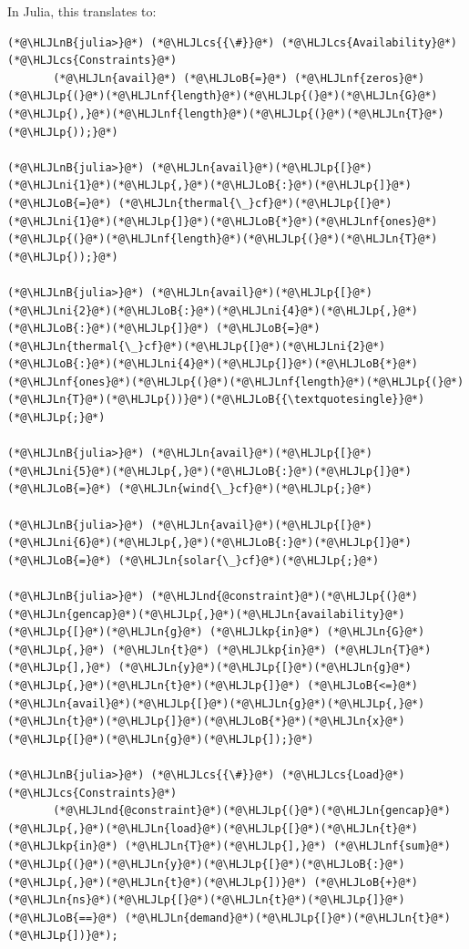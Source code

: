 \documentclass[12pt,a4paper]{article}
\newcommand{\HLJLkp}[1]{\textcolor[RGB]{148,91,176}{\textbf{#1}}}
\newcommand{\HLJLn}[1]{#1}
\newcommand{\HLJLnd}[1]{\textcolor[RGB]{214,102,97}{#1}}
\newcommand{\HLJLnf}[1]{\textcolor[RGB]{66,102,213}{#1}}
\newcommand{\HLJLnB}[1]{\textcolor[RGB]{59,151,46}{#1}}
\newcommand{\HLJLni}[1]{\textcolor[RGB]{59,151,46}{#1}}
\newcommand{\HLJLoB}[1]{\textcolor[RGB]{102,102,102}{\textbf{#1}}}
\newcommand{\HLJLp}[1]{#1}
\newcommand{\HLJLcs}[1]{\textcolor[RGB]{153,153,119}{\textit{#1}}}
\begin{document}
In Julia, this translates to:


\begin{lstlisting}
(*@\HLJLnB{julia>}@*) (*@\HLJLcs{{\#}}@*) (*@\HLJLcs{Availability}@*) (*@\HLJLcs{Constraints}@*)
       (*@\HLJLn{avail}@*) (*@\HLJLoB{=}@*) (*@\HLJLnf{zeros}@*)(*@\HLJLp{(}@*)(*@\HLJLnf{length}@*)(*@\HLJLp{(}@*)(*@\HLJLn{G}@*)(*@\HLJLp{),}@*)(*@\HLJLnf{length}@*)(*@\HLJLp{(}@*)(*@\HLJLn{T}@*)(*@\HLJLp{));}@*)

(*@\HLJLnB{julia>}@*) (*@\HLJLn{avail}@*)(*@\HLJLp{[}@*)(*@\HLJLni{1}@*)(*@\HLJLp{,}@*)(*@\HLJLoB{:}@*)(*@\HLJLp{]}@*) (*@\HLJLoB{=}@*) (*@\HLJLn{thermal{\_}cf}@*)(*@\HLJLp{[}@*)(*@\HLJLni{1}@*)(*@\HLJLp{]}@*)(*@\HLJLoB{*}@*)(*@\HLJLnf{ones}@*)(*@\HLJLp{(}@*)(*@\HLJLnf{length}@*)(*@\HLJLp{(}@*)(*@\HLJLn{T}@*)(*@\HLJLp{));}@*)

(*@\HLJLnB{julia>}@*) (*@\HLJLn{avail}@*)(*@\HLJLp{[}@*)(*@\HLJLni{2}@*)(*@\HLJLoB{:}@*)(*@\HLJLni{4}@*)(*@\HLJLp{,}@*)(*@\HLJLoB{:}@*)(*@\HLJLp{]}@*) (*@\HLJLoB{=}@*) (*@\HLJLn{thermal{\_}cf}@*)(*@\HLJLp{[}@*)(*@\HLJLni{2}@*)(*@\HLJLoB{:}@*)(*@\HLJLni{4}@*)(*@\HLJLp{]}@*)(*@\HLJLoB{*}@*)(*@\HLJLnf{ones}@*)(*@\HLJLp{(}@*)(*@\HLJLnf{length}@*)(*@\HLJLp{(}@*)(*@\HLJLn{T}@*)(*@\HLJLp{))}@*)(*@\HLJLoB{{\textquotesingle}}@*)(*@\HLJLp{;}@*)

(*@\HLJLnB{julia>}@*) (*@\HLJLn{avail}@*)(*@\HLJLp{[}@*)(*@\HLJLni{5}@*)(*@\HLJLp{,}@*)(*@\HLJLoB{:}@*)(*@\HLJLp{]}@*) (*@\HLJLoB{=}@*) (*@\HLJLn{wind{\_}cf}@*)(*@\HLJLp{;}@*)

(*@\HLJLnB{julia>}@*) (*@\HLJLn{avail}@*)(*@\HLJLp{[}@*)(*@\HLJLni{6}@*)(*@\HLJLp{,}@*)(*@\HLJLoB{:}@*)(*@\HLJLp{]}@*) (*@\HLJLoB{=}@*) (*@\HLJLn{solar{\_}cf}@*)(*@\HLJLp{;}@*)

(*@\HLJLnB{julia>}@*) (*@\HLJLnd{@constraint}@*)(*@\HLJLp{(}@*)(*@\HLJLn{gencap}@*)(*@\HLJLp{,}@*)(*@\HLJLn{availability}@*)(*@\HLJLp{[}@*)(*@\HLJLn{g}@*) (*@\HLJLkp{in}@*) (*@\HLJLn{G}@*)(*@\HLJLp{,}@*) (*@\HLJLn{t}@*) (*@\HLJLkp{in}@*) (*@\HLJLn{T}@*)(*@\HLJLp{],}@*) (*@\HLJLn{y}@*)(*@\HLJLp{[}@*)(*@\HLJLn{g}@*)(*@\HLJLp{,}@*)(*@\HLJLn{t}@*)(*@\HLJLp{]}@*) (*@\HLJLoB{<=}@*) (*@\HLJLn{avail}@*)(*@\HLJLp{[}@*)(*@\HLJLn{g}@*)(*@\HLJLp{,}@*)(*@\HLJLn{t}@*)(*@\HLJLp{]}@*)(*@\HLJLoB{*}@*)(*@\HLJLn{x}@*)(*@\HLJLp{[}@*)(*@\HLJLn{g}@*)(*@\HLJLp{]);}@*)

(*@\HLJLnB{julia>}@*) (*@\HLJLcs{{\#}}@*) (*@\HLJLcs{Load}@*) (*@\HLJLcs{Constraints}@*)
       (*@\HLJLnd{@constraint}@*)(*@\HLJLp{(}@*)(*@\HLJLn{gencap}@*)(*@\HLJLp{,}@*)(*@\HLJLn{load}@*)(*@\HLJLp{[}@*)(*@\HLJLn{t}@*) (*@\HLJLkp{in}@*) (*@\HLJLn{T}@*)(*@\HLJLp{],}@*) (*@\HLJLnf{sum}@*)(*@\HLJLp{(}@*)(*@\HLJLn{y}@*)(*@\HLJLp{[}@*)(*@\HLJLoB{:}@*)(*@\HLJLp{,}@*)(*@\HLJLn{t}@*)(*@\HLJLp{])}@*) (*@\HLJLoB{+}@*) (*@\HLJLn{ns}@*)(*@\HLJLp{[}@*)(*@\HLJLn{t}@*)(*@\HLJLp{]}@*) (*@\HLJLoB{==}@*) (*@\HLJLn{demand}@*)(*@\HLJLp{[}@*)(*@\HLJLn{t}@*)(*@\HLJLp{])}@*);
\end{lstlisting}
\end{document}
